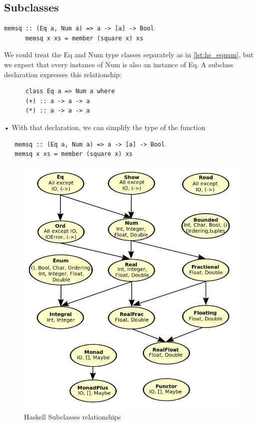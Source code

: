 \subsection{Subclasses}
\begin{paracol}{2}
   \vspace{\fill}
   \begin{lstlisting}[label={lst:hs_eqnum}]
      memsq :: (Eq a, Num a) => a -> [a] -> Bool
      memsq x xs = member (square x) xs
   \end{lstlisting}
   We could treat the Eq and Num type classes separately as in \ref{lst:hs_eqnum}, but we expect that every instance of Num is also an instance of Eq.
   A subclass declaration expresses this relationship:
   \begin{lstlisting}
      class Eq a => Num a where
      (+) :: a -> a -> a
      (*) :: a -> a -> a
   \end{lstlisting}
• With that declaration, we can simplify the type of the function

\begin{lstlisting}
   memsq :: (Eq a, Num a) => a -> [a] -> Bool
   memsq x xs = member (square x) xs
\end{lstlisting}

\vspace{\fill}
\switchcolumn

\begin{figure}[htbp]
   \centering
   \includegraphics{images/haskell_subclasses.png}
   \caption{Haskell Subclasses relationships}
   \label{fig:haskell_subclasses}
\end{figure}

\end{paracol}

